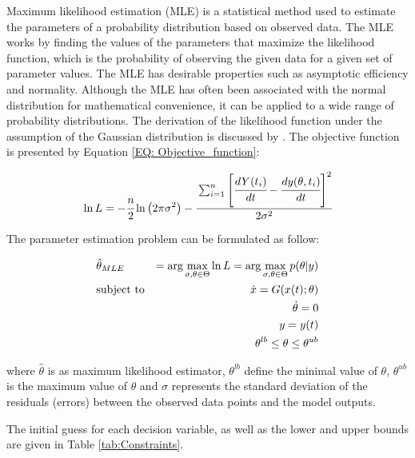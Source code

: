 \documentclass[../Article_Model_Parameters.tex]{subfiles}
\begin{document}
	Maximum likelihood estimation (MLE) is a statistical method used to estimate the parameters of a probability distribution based on observed data. The MLE works by finding the values of the parameters that maximize the likelihood function, which is the probability of observing the given data for a given set of parameter values. The MLE has desirable properties such as asymptotic efficiency and normality. Although the MLE has often been associated with the normal distribution for mathematical convenience, it can be applied to a wide range of probability distributions. The derivation of the likelihood function under the assumption of the Gaussian distribution is discussed by \citet{Himmelblau1970}. The objective function is presented by Equation \ref{EQ: Objective_function}:
	
	{\footnotesize
		\begin{equation} \label{EQ: Objective_function}
			\ln L = -\cfrac{n}{2}  \ln \left(2 \pi \sigma^2\right) 
			- \cfrac{ \sum_{i=1}^{n} \left[  \cfrac{d {Y}(t_i)}{dt} - \cfrac{dy(\theta, t_i)}{dt} \right]^2 }{2 \sigma^2}
		\end{equation}
	}
	
	The parameter estimation problem can be formulated as follow:
	
	{\footnotesize
		\begin{equation}
			\begin{aligned} \label{EQ: Optimization_formulation_MLE}
				&\hat{\theta}_{MLE} &= \arg \max_{\sigma, \theta \in \Theta} \ln L = \arg \max_{\sigma,\theta \in \Theta} p(\theta|y) \\
				&\text{subject to}
				& \dot{ x } = G({\color{black} x}(t);\theta) \\
				&& \dot{\theta} = 0 \\
				&& y = y(t) \\
				&& \theta^{lb} \leq \theta \leq \theta^{ub}
			\end{aligned}
	\end{equation} } 
	
	where $\hat{\theta}$ is as maximum likelihood estimator, $\theta^{lb}$ define the minimal value of $\theta$, $\theta^{ub}$ is the maximum value of $\theta$ and $\sigma$ represents the standard deviation of the residuals (errors) between the observed data points and the model outputs.
	
	The initial guess for each decision variable, as well as the lower and upper bounds are given in Table \ref{tab:Constraints}. 
	
\end{document}
